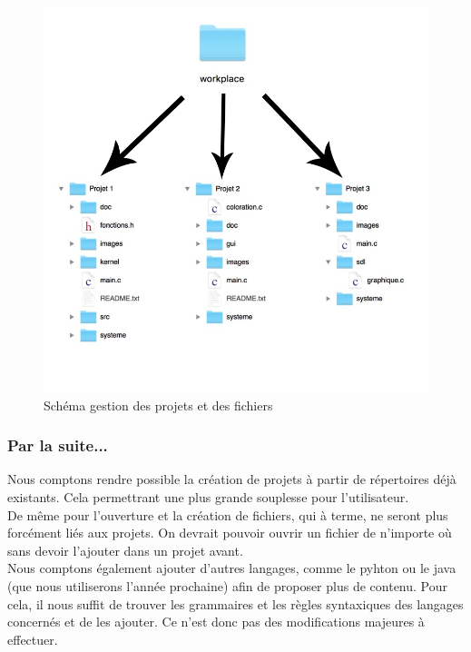 \documentclass[a4paper,12pt]{article}
\begin{document}
		\begin{figure}[h!]
			\begin{center}
				\includegraphics[scale=0.5]{images/nav_fic}
				\caption{Schéma gestion des projets et des fichiers}
			\end{center}
		\end{figure}
		
		\newpage
			
		\subsubsection*{Par la suite...}
		
				Nous comptons rendre possible la création de projets à partir de répertoires déjà existants. Cela permettrant une plus grande souplesse pour l'utilisateur.\\
				De même pour l'ouverture et la création de fichiers, qui à terme, ne seront plus forcément liés aux projets. On devrait pouvoir ouvrir un fichier de n'importe où sans devoir l'ajouter dans un projet avant.\\
				
				Nous comptons également ajouter d'autres langages, comme le pyhton ou le java (que nous utiliserons l'année prochaine) afin de proposer plus de contenu. Pour cela, il nous suffit de trouver les grammaires et les règles syntaxiques des langages concernés et de les ajouter. Ce n'est donc pas des modifications majeures à effectuer.
			
\end{document}
